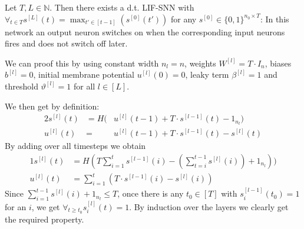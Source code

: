 \begin{example}\label{ex:2}
  Let \(T,L∈ℕ\). Then there exists a d.t. LIF-SNN with \(∀_{t∈T}s^{[L]}(t)=\max_{t'∈[t-1]}(s^{[0]}(t'))\) for any \(s^{[0]}∈\{0,1\}^{n_0×T}\): In this network an output neuron switches on when the corresponding input neurons fires and does not switch off later.

  We can proof this by using constant width \(n_l=n\), weights \(W^{[l]}=T·I_n\), biases \(b^{[l]}=0\), initial membrane potential \(u^{[l]}(0)=0\), leaky term \(β^{[l]}=1\) and threshold \(ϑ^{[l]}=1\) for all \(l∈[L]\).

  We then get by definition:
  \begin{alignat*}{2}
    s^{[l]}(t) & = H(&u^{[l]}(t-1)+T·s^{[l-1]}(t)-1_{n_l}) \\
    u^{[l]}(t) & = &u^{[l]}(t-1)+T·s^{[l-1]}(t)-s^{[l]}(t)
  \end{alignat*}
  By adding over all timesteps we obtain
  \begin{alignat*}{1}
    s^{[l]}(t) & = H(T\sum_{i=1}^ts^{[l-1]}(i)-(\sum_{t=i}^{t-1}s^{[l]}(i))+1_{n_l}) ) \\
    u^{[l]}(t) & = \sum_{i=1}^t(T·s^{[l-1]}(i)-s^{[l]}(i))
  \end{alignat*}
  Since \(\sum_{i=1}^{t-1}s^{[l]}(i)+1_{n_l}≤T\), once there is any \(t_0∈[T]\) with \(s^{[l-1]}_i(t_0)=1\) for an \(i\), we get \(∀_{t≥t_0}s^{[l]}_i(t)=1\).
  By induction over the layers we clearly get the required property.
\end{example}
